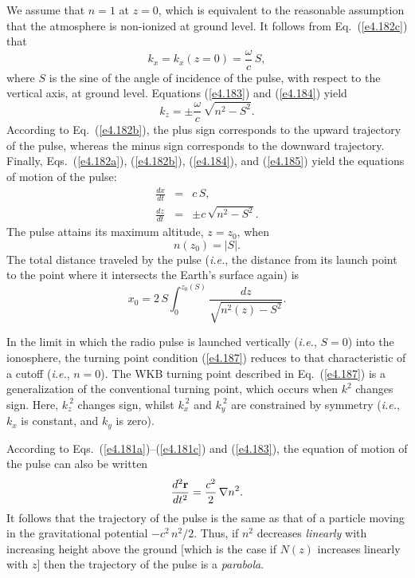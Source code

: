 We assume that $n=1$ at $z=0$, which is equivalent to the
reasonable assumption that the atmosphere is non-ionized at ground level. 
It follows from  Eq.~(\ref{e4.182c}) that
\begin{equation}\label{e4.184}
k_x= k_x(z=0) = \frac{\omega}{c}\,S,
\end{equation}
where $S$ is the sine of the angle of incidence of the pulse, with respect to
the vertical axis, at ground level. Equations (\ref{e4.183}) and (\ref{e4.184})  yield
\begin{equation}\label{e4.185}
k_z = \pm \frac{\omega}{c}\,\sqrt{n^2-S^2}.
\end{equation}
According to Eq.~(\ref{e4.182b}), the plus sign corresponds to the upward trajectory
of the pulse, whereas the minus sign corresponds to the downward trajectory.
Finally, Eqs.~(\ref{e4.182a}), (\ref{e4.182b}), (\ref{e4.184}), and (\ref{e4.185})
 yield the equations of motion of the pulse:
\begin{eqnarray}
\frac{dx}{dt} &=& c\,S,\\[0.5ex]
\frac{dz}{dt} &=& \pm c\, \sqrt{n^2-S^2}.
\end{eqnarray}
The pulse attains its maximum altitude, $z=z_0$, when
\begin{equation}\label{e4.187}
n(z_0) = |S|.
\end{equation}
The total distance traveled by the pulse ({\em i.e.}, the distance 
from its launch
point to the point where it intersects the Earth's surface again) is
\begin{equation}
x_0 = 2\,S\int_0^{z_0(S)} \frac{dz}{\sqrt{n^2(z)-S^2}}.
\end{equation}

In the limit in which the radio pulse is launched vertically ({\em i.e.},
$S=0$) into the ionosphere, the turning point condition (\ref{e4.187}) reduces to
that characteristic of a cutoff ({\em i.e.}, $n=0$). The WKB turning point
described in Eq.~(\ref{e4.187}) is a generalization of the conventional turning point,
which occurs when $k^2$ changes sign. Here, $k_z^{~2}$ changes sign, whilst
$k_x^{~2}$ and $k_y^{~2}$ are constrained by symmetry ({\em i.e.}, $k_x$ is constant,
and $k_y$ is zero). 

According to Eqs.~(\ref{e4.181a})--(\ref{e4.181c}) and (\ref{e4.183}), the equation of motion of the pulse
can also be written
\begin{equation}
\frac{d^2{\bf r}}{dt^2} = \frac{c^2}{2}\,\nabla n^2.
\end{equation}
It follows that the trajectory of the pulse is the same as that of a
particle moving in the gravitational potential $-c^2\,n^2/2$. Thus, if
$n^2$ decreases {\em linearly} with increasing height above the
ground [which is the case if $N(z)$ increases linearly with $z$] then the
trajectory of the pulse is a {\em parabola}. 